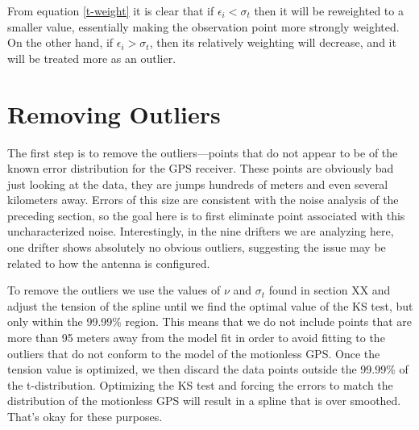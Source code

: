 \documentclass[twocol]{ametsoc}
\begin{document}
From equation \ref{t-weight} it is clear that if $\epsilon_i < \sigma_t$ then it will be reweighted to a smaller value, essentially making the observation point more strongly weighted. On the other hand, if $\epsilon_i > \sigma_t$, then its relatively weighting will decrease, and it will be treated more as an outlier.

\section{Removing Outliers}

The first step is to remove the outliers---points that do not appear to be of the known error distribution for the GPS receiver. These points are obviously bad just looking at the data, they are jumps hundreds of meters and even several kilometers away. Errors of this size are consistent with the noise analysis of the preceding section, so the goal here is to first eliminate point associated with this uncharacterized noise. Interestingly, in the nine drifters we are analyzing here, one drifter shows absolutely no obvious outliers, suggesting the issue may be related to how the antenna is configured.

To remove the outliers we use the values of $\nu$ and $\sigma_t$ found in section XX and adjust the tension of the spline until we find the optimal value of the KS test, but only within the 99.99\% region. This means that we do not include points that are more than 95 meters away from the model fit in order to avoid fitting to the outliers that do not conform to the model of the motionless GPS. Once the tension value is optimized, we then discard the data points outside the 99.99\% of the t-distribution. Optimizing the KS test and forcing the errors to match the distribution of the motionless GPS will result in a spline that is over smoothed. That's okay for these purposes.
\end{document}
